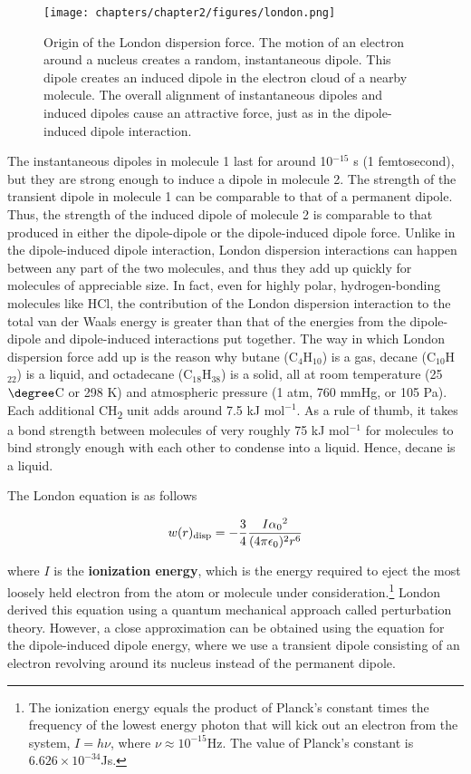     \begin{figure}[h!]
    \centering
      \texttt{[image: chapters/chapter2/figures/london.png]}
      \caption{Origin of the London dispersion force. The motion of an electron around a nucleus creates a random, instantaneous dipole. This dipole creates an induced dipole in the electron cloud of a nearby molecule. The overall alignment of instantaneous dipoles and induced dipoles cause an attractive force, just as in the dipole-induced dipole interaction.}
      \label{fig:london}
    \end{figure}

    The instantaneous dipoles in molecule 1 last for around 10$^{-15}$ s (1 femtosecond), but they are strong enough to induce a dipole in molecule 2. The strength of the transient dipole in molecule 1 can be comparable to that of a permanent dipole. Thus, the strength of the induced dipole of molecule 2 is comparable to that produced in either the dipole-dipole or the dipole-induced dipole force. Unlike in the dipole-induced dipole interaction, London dispersion interactions can happen between any part of the two molecules, and thus they add up quickly for molecules of appreciable size. In fact, even for highly polar, hydrogen-bonding molecules like HCl, the contribution of the London dispersion interaction to the total van der Waals energy is greater than that of the energies from the dipole-dipole and dipole-induced interactions put together. The way in which London dispersion force add up is the reason why butane (C$_{4}$H$_{10}$) is a gas, decane (C$_{10}$H$_{22}$) is a liquid, and octadecane (C$_{18}$H$_{38}$) is a solid, all at room temperature (25 $\degree$C or 298 K) and atmospheric pressure (1 atm, 760 mmHg, or 105 Pa). Each additional CH\textsubscript{2} unit adds around 7.5 kJ mol$^{-1}$. As a rule of thumb, it takes a bond strength between molecules of very roughly 75 kJ mol$^{-1}$ for molecules to bind strongly enough with each other to condense into a liquid. Hence, decane is a liquid.

    The London equation is as follows

    \begin{equation}
    \label{disp}
        w(r)\textsubscript{disp}=-\frac{3}{4}\frac{I\alpha\textsubscript{0}^{2}}{(4\pi\epsilon\textsubscript{0})^{2}r^{6}}
    \end{equation}

    where $I$ is the \textbf{ionization energy}, which is the energy required to eject the most loosely held electron from the atom or molecule under consideration.\footnote{The ionization energy equals the product of Planck's constant times the frequency of the lowest energy photon that will kick out an electron from the system, $I=h\nu$, where $\nu\approx10^{-15}$Hz. The value of Planck's constant is $6.626\times10^{-34}$Js.} London derived this equation using a quantum mechanical approach called perturbation theory. However, a close approximation can be obtained using the equation for the dipole-induced dipole energy, where we use a transient dipole consisting of an electron revolving around its nucleus instead of the permanent dipole. 

